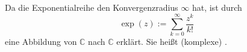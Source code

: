 Da die Exponentialreihe den Konvergenzradius $\infty$ hat, ist durch
$$\exp(z) := \sum_{k=0}^{\infty} \frac{z^k}{k!}$$
eine Abbildung von $\mathbb{C}$ nach $\mathbb{C}$ erklärt. Sie heißt (komplexe) .